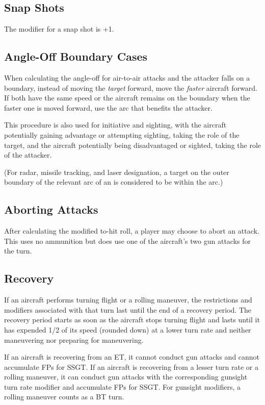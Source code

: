 \documentclass[10pt]{article}
\begin{document}
\subsection{Snap Shots} The modifier for a snap shot is +1.

\subsection{Angle-Off Boundary Cases} When calculating the angle-off for air-to-air attacks and the attacker falls on a boundary, instead of moving the \emph{target} forward, move the \emph{faster} aircraft forward. If both have the same speed or the aircraft remains on the boundary when the faster one is moved forward, use the arc that benefits the attacker. 

This procedure is also used for initiative and sighting, with the aircraft potentially gaining advantage or attempting sighting, taking the role of the target, and the aircraft potentially being disadvantaged or sighted, taking the role of the attacker.

(For radar, missile tracking, and laser designation, a target on the outer boundary of the relevant arc of an is considered to be within the arc.)

\subsection{Aborting Attacks} After calculating the modified to-hit roll, a player may choose to abort an attack. This uses no ammunition but does use one of the aircraft's two gun attacks for the turn.

\subsection{Recovery} If an aircraft performs turning flight or a rolling maneuver, the restrictions and modifiers associated with that turn last until the end of a recovery period. The recovery period starts as soon as the aircraft stops turning flight and lasts until it has expended 1/2 of its speed (rounded down) at a lower turn rate and neither maneuvering nor preparing for maneuvering. 

If an aircraft is recovering from an ET, it cannot conduct gun attacks and cannot accumulate FPs for SSGT. If an aircraft is recovering from a lesser turn rate or a rolling maneuver, it can conduct gun attacks with the corresponding gunsight turn rate modifier and accumulate FPs for SSGT. For gunsight modifiers, a rolling maneuver counts as a BT turn.
\end{document}
